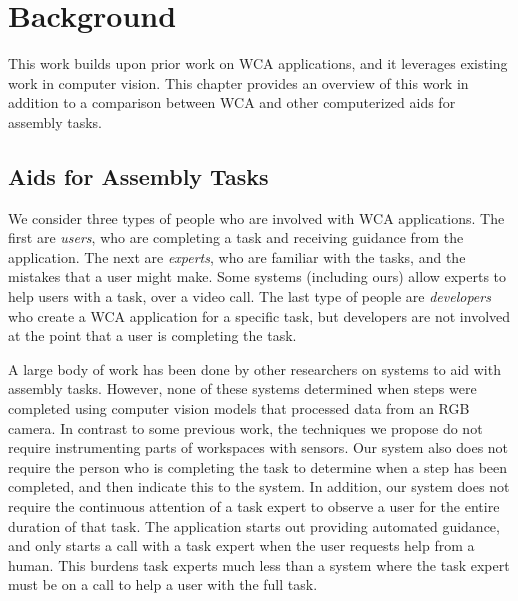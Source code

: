 \chapter{Background}\label{chap:background}

This work builds upon prior work on WCA applications, and it leverages
existing work in computer vision.
This chapter provides an overview of this work in addition to a comparison
between WCA and other computerized aids for assembly tasks.

\section{Aids for Assembly Tasks}

We consider three types of people who are involved with WCA applications.
The first are \emph{users}, who are completing a task and receiving guidance
from the application.
The next are \emph{experts}, who are familiar with the tasks, and the mistakes
that a user might make.
Some systems (including ours) allow experts to help users with a task, over a
video call.
The last type of people are \emph{developers} who create a WCA application for
a specific task, but developers are not involved at the point that a user
is completing the task.

A large body of work has been done by other researchers on systems to aid with
assembly tasks.
However, none of these systems determined when steps were completed using
computer vision models that processed data from an RGB camera.
In contrast to some previous work, the techniques we
propose do not require instrumenting parts of workspaces with sensors.
Our system also does not require the person who is completing the task to
determine when a step has been completed, and then indicate this to the system.
In addition, our system does not require the continuous attention of a task
expert to observe a user for the entire duration of that task.
The application starts out providing automated guidance, and only starts a call
with a task expert when the user requests help from a human.
This burdens task experts much less than a system where the task expert must be
on a call to help a user with the full task.

